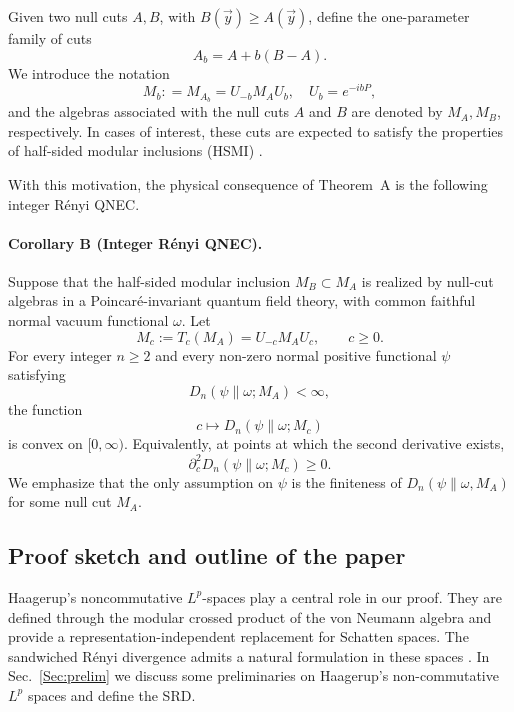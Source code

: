 \documentclass[11pt,a4paper]{article}
\theoremstyle{plain}
\numberwithin{theorem}{section}
\theoremstyle{definition}
\newcommand{\?}{\overset{?}{=}}
\newcommand{\defeq}{\mathrel{\mathop:}=}
\newcommand{\I}{\infty}
\begin{document}
Given two null cuts $A,B$, with $B(\vec y)\geq A(\vec y)$, define the one-parameter family of cuts  
\[
    A_b=A+ b(B-A).
\]
We introduce the notation
\[
    M_{b}\defeq M_{A_b} = U_{-b}M_A U_b, \quad U_b= e^{-ibP},
\]
and the algebras associated with the null cuts $A$ and $B$ are denoted by $M_A,M_B$, respectively. In cases of interest, these cuts are expected to satisfy the properties of half-sided modular inclusions (HSMI) \cite{Borchers:1991xk,Wiesbrock:1992mg,Borchers:1995zg,Borchers1996,Araki:2005we}.

With this motivation, the physical consequence of Theorem~A is the following integer R\'enyi QNEC.  
\paragraph*{Corollary B (Integer R\'enyi QNEC).}
Suppose that the half-sided modular inclusion \(M_B\subset M_A\) is realized by null-cut
algebras in a Poincar\'e-invariant quantum field theory, with common faithful normal vacuum functional
\(\omega\).  Let
\[
        M_c:=T_c(M_A)=U_{-c}M_AU_c,
        \qquad c\geq0.
\]
For every integer \(n\geq2\) and every non-zero normal positive functional
\(\psi\) satisfying
\begin{equation}\label{assum:Assum1}
        D_n(\psi\|\omega;M_A)<\I,
\end{equation}
the function
\begin{equation}\label{eq:intro-RQNEC}
        c\longmapsto D_n(\psi\|\omega;M_c)
\end{equation}
is convex on \([0,\I)\).  Equivalently, at points at which the second
derivative exists,
\begin{equation}
        \partial_c^2D_n(\psi\|\omega;M_c)\geq0.
\end{equation}
We emphasize that the only assumption on $\psi$ is the finiteness of $D_n(\psi\|\omega,M_A)$ for some null cut $M_A$.%

\subsection{Proof sketch and outline of the paper}
Haagerup's noncommutative \(L^p\)-spaces play a central role in our proof.  They are
defined through the modular crossed product of the von Neumann algebra and
provide a representation-independent replacement for Schatten spaces.
The sandwiched R\'enyi divergence admits a natural formulation in these
spaces \cite{Jencova:2016tqz,Jencova:2017txf}. In Sec.~\ref{Sec:prelim} we discuss some preliminaries on Haagerup's non-commutative $L^p$ spaces and define the SRD. 
\end{document}
